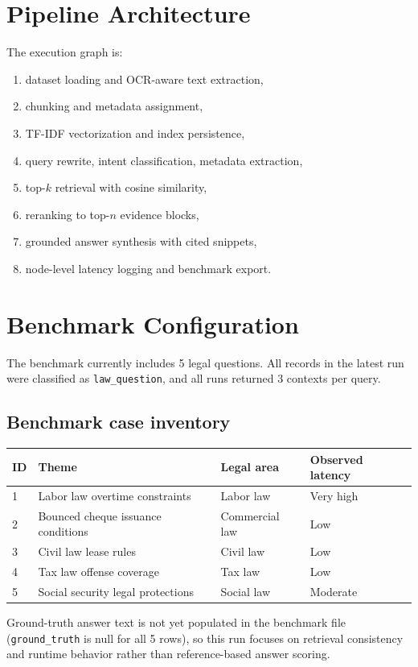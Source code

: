 \documentclass[12pt,a4paper]{article}
\begin{document}
\section{Pipeline Architecture}
The execution graph is:
\begin{enumerate}
\item dataset loading and OCR-aware text extraction,
\item chunking and metadata assignment,
\item TF-IDF vectorization and index persistence,
\item query rewrite, intent classification, metadata extraction,
\item top-$k$ retrieval with cosine similarity,
\item reranking to top-$n$ evidence blocks,
\item grounded answer synthesis with cited snippets,
\item node-level latency logging and benchmark export.
\end{enumerate}

\section{Benchmark Configuration}
The benchmark currently includes 5 legal questions. All records in the latest run were classified as \texttt{law\_question}, and all runs returned 3 contexts per query.

\subsection*{Benchmark case inventory}
\begin{longtable}{@{}p{} p{} p{} p{}@{}}
\toprule
ID & Theme & Legal area & Observed latency \\
\midrule
1 & Labor law overtime constraints & Labor law & Very high \\
2 & Bounced cheque issuance conditions & Commercial law & Low \\
3 & Civil law lease rules & Civil law & Low \\
4 & Tax law offense coverage & Tax law & Low \\
5 & Social security legal protections & Social law & Moderate \\
\bottomrule
\end{longtable}

Ground-truth answer text is not yet populated in the benchmark file (\texttt{ground\_truth} is null for all 5 rows), so this run focuses on retrieval consistency and runtime behavior rather than reference-based answer scoring.
\end{document}
